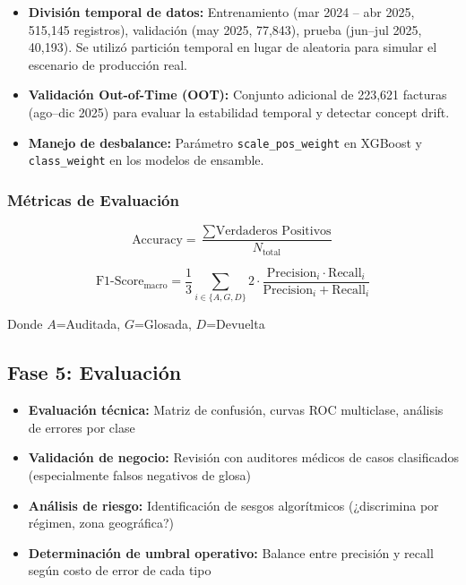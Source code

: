 \documentclass[12pt,letterpaper]{report}
\begin{document}
\begin{itemize}
    \item \textbf{División temporal de datos:} Entrenamiento (mar 2024 -- abr 2025, 515,145 registros), validación (may 2025, 77,843), prueba (jun--jul 2025, 40,193). Se utilizó partición temporal en lugar de aleatoria para simular el escenario de producción real.
    \item \textbf{Validación Out-of-Time (OOT):} Conjunto adicional de 223,621 facturas (ago--dic 2025) para evaluar la estabilidad temporal y detectar concept drift.
    \item \textbf{Manejo de desbalance:} Parámetro \texttt{scale\_pos\_weight} en XGBoost y \texttt{class\_weight} en los modelos de ensamble.
\end{itemize}

\subsubsection{Métricas de Evaluación}

\begin{equation}
\text{Accuracy} = \frac{\sum \text{Verdaderos Positivos}}{N_{\text{total}}}
\end{equation}

\begin{equation}
\text{F1-Score}_{\text{macro}} = \frac{1}{3} \sum_{i \in \{A,G,D\}} 2 \cdot \frac{\text{Precision}_i \cdot \text{Recall}_i}{\text{Precision}_i + \text{Recall}_i}
\end{equation}

Donde $A$=Auditada, $G$=Glosada, $D$=Devuelta

\subsection{Fase 5: Evaluación}

\begin{itemize}
    \item \textbf{Evaluación técnica:} Matriz de confusión, curvas ROC multiclase, análisis de errores por clase
    \item \textbf{Validación de negocio:} Revisión con auditores médicos de casos clasificados (especialmente falsos negativos de glosa)
    \item \textbf{Análisis de riesgo:} Identificación de sesgos algorítmicos (¿discrimina por régimen, zona geográfica?)
    \item \textbf{Determinación de umbral operativo:} Balance entre precisión y recall según costo de error de cada tipo
\end{itemize}
\end{document}
